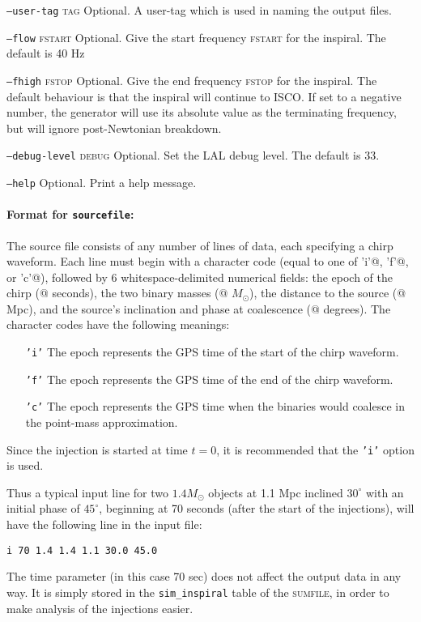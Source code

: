 \begin{entry}
\begin{entry}
\item[\texttt{--user-tag} \textsc{tag}] Optional.  A user-tag which is
used in naming the output files.

\item[\texttt{--flow} \textsc{fstart}] Optional.  Give the start frequency
\textsc{fstart} for the inspiral.  The default is 40 Hz

\item[\texttt{--fhigh} \textsc{fstop}] Optional.  Give the end frequency
\textsc{fstop} for the inspiral.  The default behaviour is that the inspiral
will continue to ISCO.  If set to a negative number, the generator will use its
absolute value as the terminating frequency, but will ignore post-Newtonian
breakdown. 

\item[\texttt{--debug-level} \textsc{debug}]  Optional.  Set the LAL debug
level.  The default is 33.

\item[\texttt{--help}] Optional.  Print a help message.
\end{entry}

\paragraph{Format for \texttt{sourcefile}:} The source file consists
of any number of lines of data, each specifying a chirp waveform.
Each line must begin with a character code (\verb@CHAR@ equal to one
of \verb@'i'@, \verb@'f'@, or \verb@'c'@), followed by 6
whitespace-delimited numerical fields: the epoch of the chirp
(@ seconds), the two binary masses (@
$M_\odot$), the distance to the source (@ Mpc), and the
source's inclination and phase at coalescence (@ degrees).
The character codes have the following meanings:
\begin{itemize}
\item[\texttt{'i'}] The epoch represents the GPS time of the start of
the chirp waveform.
\item[\texttt{'f'}] The epoch represents the GPS time of the end of
the chirp waveform.
\item[\texttt{'c'}] The epoch represents the GPS time when the
binaries would coalesce in the point-mass approximation.
\end{itemize}
Since the injection is started at time $t=0$, it is recommended that the
\texttt{'i'} option is used.

Thus a typical input line for two $1.4M_\odot$ objects at 1.1 Mpc
inclined $30^\circ$ with an initial phase of $45^\circ$, beginning at
70 seconds (after the start of the injections), will have the following line in the input
file:
\begin{verbatim}
i 70 1.4 1.4 1.1 30.0 45.0
\end{verbatim}
The time parameter (in this case 70 sec) does not affect the output data in any
way.  It is simply stored in the \texttt{sim\_inspiral} table of the
\textsc{sumfile}, in order to make analysis of the injections easier.


\end{entry}
